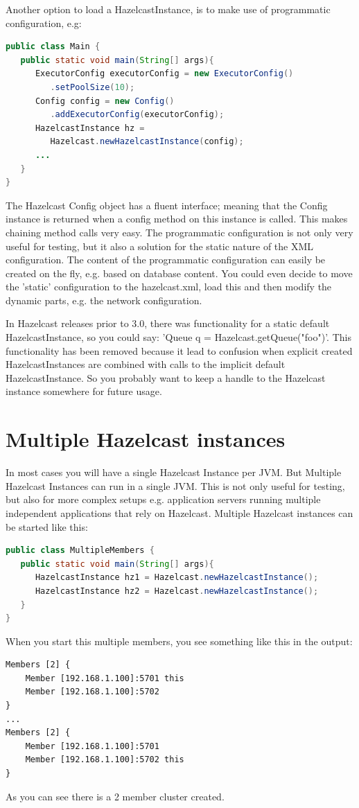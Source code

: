 Another option to load a HazelcastInstance, is to make use of programmatic configuration, e.g: 
\begin{lstlisting}[language=java]
public class Main {
   public static void main(String[] args){
      ExecutorConfig executorConfig = new ExecutorConfig()
         .setPoolSize(10);
      Config config = new Config()
         .addExecutorConfig(executorConfig);	  
      HazelcastInstance hz = 
         Hazelcast.newHazelcastInstance(config);
      ...
   }
}
\end{lstlisting}
The Hazelcast Config object has a fluent interface; meaning that the Config instance is returned when a config method on this instance is called. This makes chaining method calls very easy. The programmatic configuration is not only very useful for testing, but it also a solution for the static nature of the XML configuration. The content of the programmatic configuration can easily be created on the fly, e.g. based on database content. You could even decide to move the 'static' configuration to the hazelcast.xml, load this and then modify the dynamic parts, e.g. the network configuration.

In Hazelcast releases prior to 3.0, there was functionality for a static default HazelcastInstance, so you could say: 'Queue q = Hazelcast.getQueue("foo")'. This functionality has been removed because it lead to confusion when explicit created HazelcastInstances are combined with calls to the implicit default HazelcastInstance. So you probably want to keep a handle to the Hazelcast instance somewhere for future usage.

\section{Multiple Hazelcast instances}
In most cases you will have a single Hazelcast Instance per JVM. But Multiple Hazelcast Instances can run in a single JVM. This is not only useful for testing, but also for more complex setups e.g. application servers running multiple independent applications that rely on Hazelcast. Multiple Hazelcast instances can be started like this:
\begin{lstlisting}[language=java]
public class MultipleMembers {
   public static void main(String[] args){
      HazelcastInstance hz1 = Hazelcast.newHazelcastInstance();
      HazelcastInstance hz2 = Hazelcast.newHazelcastInstance();
   }
}
\end{lstlisting}
When you start this multiple members, you see something like this in the output:
\begin{lstlisting}
Members [2] {
    Member [192.168.1.100]:5701 this
    Member [192.168.1.100]:5702
}
...
Members [2] {
    Member [192.168.1.100]:5701
    Member [192.168.1.100]:5702 this
}
\end{lstlisting}
As you can see there is a 2 member cluster created.

